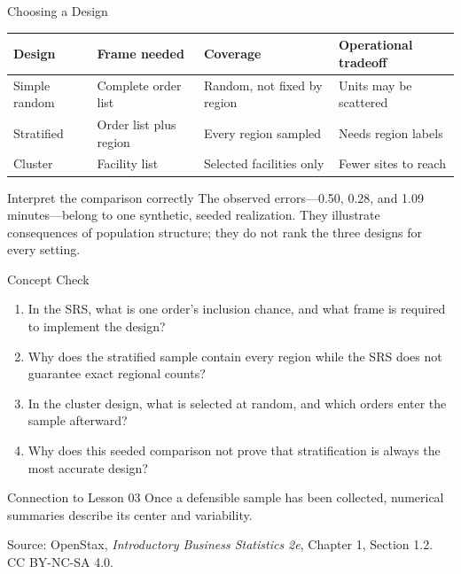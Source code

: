 \documentclass[aspectratio=169,10pt,english]{beamer}
\begin{document}
\begin{frame}{Choosing a Design}
  \small
  \begin{center}
    \begin{tabular}{p{}p{}p{}p{}}
      \toprule
      \textbf{Design} & \textbf{Frame needed} & \textbf{Coverage} & \textbf{Operational tradeoff} \\
      \midrule
      Simple random & Complete order list & Random, not fixed by region & Units may be scattered \\
      Stratified & Order list plus region & Every region sampled & Needs region labels \\
      Cluster & Facility list & Selected facilities only & Fewer sites to reach \\
      \bottomrule
    \end{tabular}
  \end{center}

  \vspace{0.8em}
  \begin{alertblock}{Interpret the comparison correctly}
    The observed errors---0.50, 0.28, and 1.09 minutes---belong to one synthetic,
    seeded realization. They illustrate consequences of population structure;
    they do not rank the three designs for every setting.
  \end{alertblock}
\end{frame}

\begin{frame}{Concept Check}
  \begin{enumerate}
    \item In the SRS, what is one order's inclusion chance, and what frame is
      required to implement the design?
    \item Why does the stratified sample contain every region while the SRS does
      not guarantee exact regional counts?
    \item In the cluster design, what is selected at random, and which orders
      enter the sample afterward?
    \item Why does this seeded comparison not prove that stratification is
      always the most accurate design?
  \end{enumerate}

  \vspace{0.5em}
  \begin{block}{Connection to Lesson 03}
    Once a defensible sample has been collected, numerical summaries describe
    its center and variability.
  \end{block}

  \vfill
  \scriptsize Source: OpenStax, \textit{Introductory Business Statistics 2e},
  Chapter 1, Section 1.2. CC BY-NC-SA 4.0.
\end{frame}

\appendix
\end{document}
